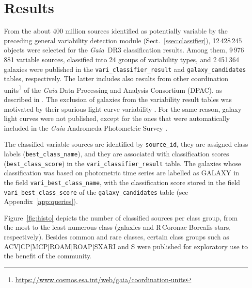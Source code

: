 \documentclass[longauth]{aa}
\def\gaia{\textit{Gaia}\xspace}
\def\gdr3{\textit{Gaia}~DR3\xspace}
\begin{document}
\section{Results\label{sec:results}}

From the about 400 million sources identified as potentially variable by the preceding general variability detection module (Sect.~\ref{ssec:classifier}), 12\,428\,245 objects were selected for the \gdr3 classification results. Among them, 9\,976\,881 variable sources, classified into 24 groups of variability types, and 2\,451\,364 galaxies were published in the \texttt{vari\_classifier\_result} and \texttt{galaxy\_candidates} tables, respectively. The latter includes also results from other coordination units\footnote{\url{https://www.cosmos.esa.int/web/gaia/coordination-units}} of the \gaia Data Processing and Analysis Consortium (DPAC), as described in \citet{DR3-DPACP-101}. The exclusion of galaxies from the variability result tables was motivated by their spurious light curve variability \citep{DR3-DPACP-164}. For the same reason, galaxy light curves were not published, except for the ones that were automatically included in the \gaia Andromeda Photometric Survey \citep{DR3-DPACP-142}.

The classified variable sources are identified by \texttt{source\_id}, they are assigned class labels (\texttt{best\_class\_name}), and they are associated with classification scores (\texttt{best\_class\_score}) in the \texttt{vari\_classifier\_result} table.
The galaxies whose classification was based on photometric time series are labelled as GALAXY in the field \texttt{vari\_best\_class\_name}, with the classification score stored in the field  \texttt{vari\_best\_class\_score} of the \texttt{galaxy\_candidates} table (see Appendix~\ref{app:queries}).

Figure~\ref{fig:histo} depicts the number of classified sources per class group, from the most to the least numerous class (galaxies and R\,Coronae Borealis stars, respectively).
Besides common and rare classes, certain class groups such as ACV|CP|MCP|ROAM|ROAP|SXARI and S were published for exploratory use to the benefit of the community.
\end{document}
